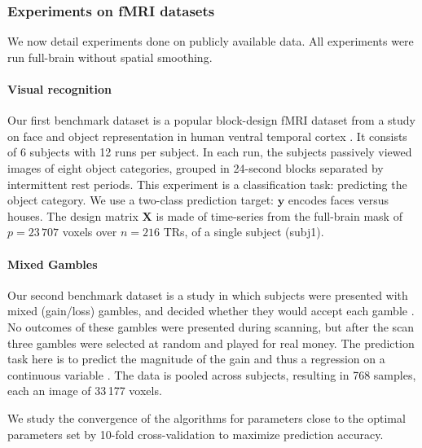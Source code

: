 \subsubsection{Experiments on fMRI datasets}
\label{sec:experiments}
We now detail experiments done on publicly available
data. All experiments were run full-brain without spatial smoothing.

\paragraph{Visual recognition}
\label{subsec:haxby}
Our first benchmark dataset is a popular block-design fMRI dataset from a study on face and
object representation in human ventral temporal cortex  \cite{haxby2001}.
It consists of
6 subjects with 12 runs per subject. In each run, the subjects
passively viewed images of eight object categories, grouped
in 24-second blocks separated by intermittent rest periods. This
experiment is a classification task: predicting the object category. We use a
two-class prediction target: $\mathbf{y}$ encodes faces versus houses.
The design matrix $\mathbf{X}$ is made of
time-series from the full-brain mask of $p = 23\,707$ voxels over $n =
216$ TRs, of a single subject (subj1).

\paragraph{Mixed Gambles}
Our second benchmark dataset is a study in which
subjects were presented with mixed (gain/loss) gambles, and decided
whether they would accept each gamble \cite{mixedgambles2007}.  No outcomes of these gambles
were presented during scanning, but after the scan three gambles were
selected at random and played for real money. The prediction task here is
to predict the magnitude of the gain and thus a regression on a
continuous variable \cite{jimura2012}. The data is pooled across
subjects, resulting in 768 samples, each an image of 33\,177 voxels.

\smallskip

We study the convergence of the algorithms for parameters close to the
optimal parameters set by 10-fold cross-validation to maximize prediction
accuracy.

